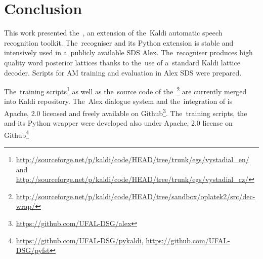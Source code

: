 \chapter{Conclusion}
\label{cha:conclusion}



This work presented the~, an extension of the~Kaldi automatic speech recognition toolkit.
The~recogniser and its Python extension is stable and intensively used in a~publicly available \acl{SDS} Alex\cite{ptics2014url}.
The~recogniser produces high quality word posterior lattices thanks to the~use of a~standard Kaldi lattice decoder.
Scripts for \acl{AM} training and evaluation in Alex \acs{SDS} were prepared.

The~training scripts\footnote{\url{http://sourceforge.net/p/kaldi/code/HEAD/tree/trunk/egs/vystadial_en/} and \url{http://sourceforge.net/p/kaldi/code/HEAD/tree/trunk/egs/vystadial_cz/}} as well as 
the~source code of the~\footnote{\url{http://sourceforge.net/p/kaldi/code/HEAD/tree/sandbox/oplatek2/src/dec-wrap/}} are currently merged into Kaldi repository.
The~Alex dialogue system and the~integration of  is Apache, 2.0 licensed and freely available on Github\footnote{\url{https://github.com/UFAL-DSG/alex}}.
The~training scripts, the~ and its Python wrapper  were developed also under Apache, 2.0 license on Github\footnote{\url{https://github.com/UFAL-DSG/pykaldi}, \url{https://github.com/UFAL-DSG/pyfst}} 

